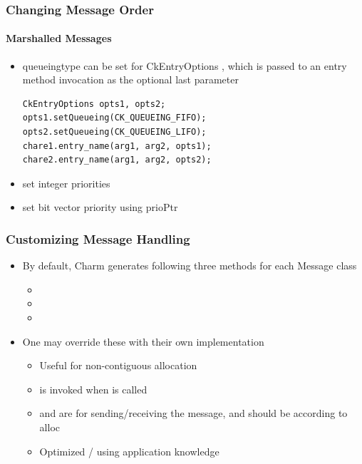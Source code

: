 \begin{frame}[fragile]
  \frametitle{Changing Message Order}
  \framesubtitle{Marshalled Messages}
  \begin{itemize}
    \item queueingtype can be set for CkEntryOptions , which is passed to an entry method invocation as the optional last parameter
    \begin{lstlisting}
CkEntryOptions opts1, opts2;
opts1.setQueueing(CK_QUEUEING_FIFO);
opts2.setQueueing(CK_QUEUEING_LIFO);
chare1.entry_name(arg1, arg2, opts1);
chare2.entry_name(arg1, arg2, opts2);
    \end{lstlisting}
    \item {} set integer priorities
    \item {}  set bit vector priority using prioPtr
  \end{itemize}
\end{frame}

\begin{frame}[fragile]
  \frametitle{Customizing Message Handling}
  \begin{itemize}
    \item By default, Charm generates following three methods for each Message class
    \begin{itemize}
      \item {}
      \item {}
      \item {}
    \end{itemize}
   \item One may override these with their own implementation
   \begin{itemize}
     \item Useful for non-contiguous allocation
     \item {} is invoked when  is called
     \item {} and  are for sending/receiving the message, and should be according to alloc
     \item Optimized / using application knowledge
   \end{itemize}
  \end{itemize}
\end{frame}

